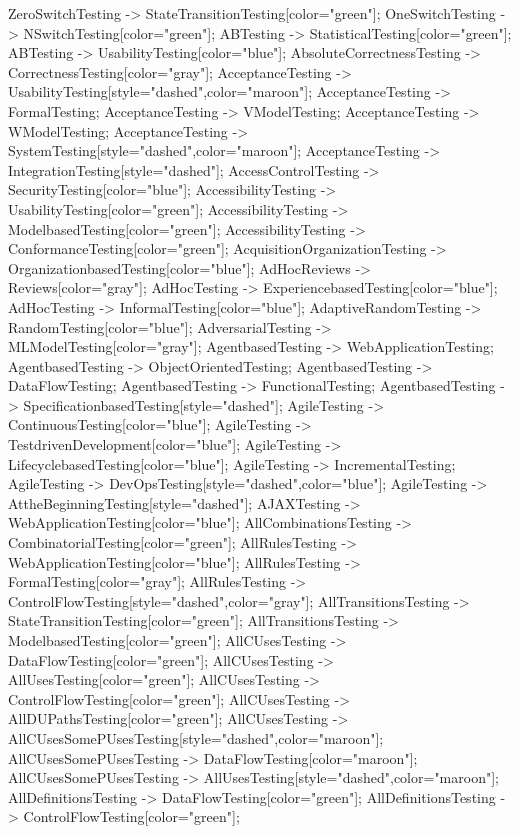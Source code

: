\documentclass{article}
\begin{document}
{ZeroSwitchTesting -> StateTransitionTesting[color="green"];
OneSwitchTesting -> NSwitchTesting[color="green"];
ABTesting -> StatisticalTesting[color="green"];
ABTesting -> UsabilityTesting[color="blue"];
AbsoluteCorrectnessTesting -> CorrectnessTesting[color="gray"];
AcceptanceTesting -> UsabilityTesting[style="dashed",color="maroon"];
AcceptanceTesting -> FormalTesting;
AcceptanceTesting -> VModelTesting;
AcceptanceTesting -> WModelTesting;
AcceptanceTesting -> SystemTesting[style="dashed",color="maroon"];
AcceptanceTesting -> IntegrationTesting[style="dashed"];
AccessControlTesting -> SecurityTesting[color="blue"];
AccessibilityTesting -> UsabilityTesting[color="green"];
AccessibilityTesting -> ModelbasedTesting[color="green"];
AccessibilityTesting -> ConformanceTesting[color="green"];
AcquisitionOrganizationTesting -> OrganizationbasedTesting[color="blue"];
AdHocReviews -> Reviews[color="gray"];
AdHocTesting -> ExperiencebasedTesting[color="blue"];
AdHocTesting -> InformalTesting[color="blue"];
AdaptiveRandomTesting -> RandomTesting[color="blue"];
AdversarialTesting -> MLModelTesting[color="gray"];
AgentbasedTesting -> WebApplicationTesting;
AgentbasedTesting -> ObjectOrientedTesting;
AgentbasedTesting -> DataFlowTesting;
AgentbasedTesting -> FunctionalTesting;
AgentbasedTesting -> SpecificationbasedTesting[style="dashed"];
AgileTesting -> ContinuousTesting[color="blue"];
AgileTesting -> TestdrivenDevelopment[color="blue"];
AgileTesting -> LifecyclebasedTesting[color="blue"];
AgileTesting -> IncrementalTesting;
AgileTesting -> DevOpsTesting[style="dashed",color="blue"];
AgileTesting -> AttheBeginningTesting[style="dashed"];
AJAXTesting -> WebApplicationTesting[color="blue"];
AllCombinationsTesting -> CombinatorialTesting[color="green"];
AllRulesTesting -> WebApplicationTesting[color="blue"];
AllRulesTesting -> FormalTesting[color="gray"];
AllRulesTesting -> ControlFlowTesting[style="dashed",color="gray"];
AllTransitionsTesting -> StateTransitionTesting[color="green"];
AllTransitionsTesting -> ModelbasedTesting[color="green"];
AllCUsesTesting -> DataFlowTesting[color="green"];
AllCUsesTesting -> AllUsesTesting[color="green"];
AllCUsesTesting -> ControlFlowTesting[color="green"];
AllCUsesTesting -> AllDUPathsTesting[color="green"];
AllCUsesTesting -> AllCUsesSomePUsesTesting[style="dashed",color="maroon"];
AllCUsesSomePUsesTesting -> DataFlowTesting[color="maroon"];
AllCUsesSomePUsesTesting -> AllUsesTesting[style="dashed",color="maroon"];
AllDefinitionsTesting -> DataFlowTesting[color="green"];
AllDefinitionsTesting -> ControlFlowTesting[color="green"];
}
\end{document}
